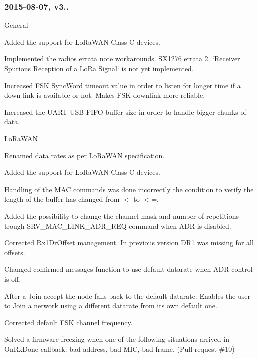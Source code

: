\subsubsection*{2015-\/08-\/07, v3..}


\begin{DoxyItemize}
\item General
\begin{DoxyEnumerate}
\item Added the support for Lo\+Ra\+W\+AN Class C devices.
\item Implemented the radios errata note workarounds. S\+X1276 errata 2. \char`\"{}\+Receiver Spurious Reception of a Lo\+Ra Signal\char`\"{} is not yet implemented.
\item Increased F\+SK Sync\+Word timeout value in order to listen for longer time if a down link is available or not. Makes F\+SK downlink more reliable.
\item Increased the U\+A\+RT U\+SB F\+I\+FO buffer size in order to handle bigger chunks of data.
\end{DoxyEnumerate}
\item Lo\+Ra\+W\+AN
\begin{DoxyEnumerate}
\item Renamed data rates as per Lo\+Ra\+W\+AN specification.
\item Added the support for Lo\+Ra\+W\+AN Class C devices.
\item Handling of the M\+AC commands was done incorrectly the condition to verify the length of the buffer has changed from $<$ to $<$=.
\item Added the possibility to change the channel mask and number of repetitions trough S\+R\+V\+\_\+\+M\+A\+C\+\_\+\+L\+I\+N\+K\+\_\+\+A\+D\+R\+\_\+\+R\+EQ command when A\+DR is disabled.
\item Corrected Rx1\+Dr\+Offset management. In previous version D\+R1 was missing for all offsets.
\item Changed confirmed messages function to use default datarate when A\+DR control is off.
\item After a Join accept the node falls back to the default datarate. Enables the user to Join a network using a different datarate from its own default one.
\item Corrected default F\+SK channel frequency.
\item Solved a firmware freezing when one of the following situations arrived in On\+Rx\+Done callback\+: bad address, bad M\+IC, bad frame. (Pull request \#10)

\end{DoxyEnumerate}
\end{DoxyItemize}
